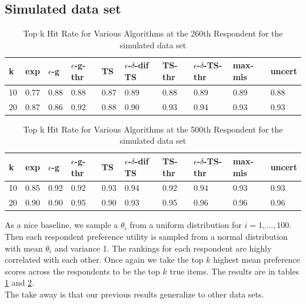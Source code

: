 \documentclass[nonblindrev]{informs3}
\newcommand{\fixedexpressS}{\textbf{exp}}
\newcommand{\egreedyS}{$\epsilon$-\textbf{g}}
\newcommand{\egreedythresS}{$\epsilon$-\textbf{g-thr}}
\newcommand{\misminS}{\textbf{max-mis}}
\newcommand{\tsS}{\textbf{TS} }
\newcommand{\edtsS}{$\epsilon$-$\delta$-\textbf{dif TS} }
\newcommand{\tsthresS}{\textbf{TS-thr} }
\newcommand{\edtsthresS}{$\epsilon$-$\delta$-\textbf{TS-thr} }
\newcommand{\uncertS}{\textbf{uncert} }
\begin{document}
\subsection{Simulated data set}
\begin{table}
\begin{center}
\begin{tabular}{llllllllll}
\hline   k &  \fixedexpressS & \egreedyS&\egreedythresS&\tsS&\edtsS&\tsthresS&\edtsthresS& \misminS& \uncertS \\\hline  10 & 0.77 &   0.88 & 0.88  & 0.87&0.89 & 	0.88&0.89 & 0.89 &  0.88 \\  20 &  0.87 &  0.86 &   0.92  & 0.88&0.90 &  	0.93&0.94&  0.93 &  0.93 \end{tabular}
\end{center}
\caption{Top k Hit Rate for Various Algorithms at the 260th Respondent for the simulated data set}
\label{table:nice260}
\end{table}
\begin{table}
\begin{center}
\begin{tabular}{llllllllll}
\hline   k &  \fixedexpressS & \egreedyS&\egreedythresS&\tsS&\edtsS&\tsthresS&\edtsthresS& \misminS& \uncertS  \\\hline    10 & 0.85&0.92&0.92 & 0.93&0.94 & 0.92&0.94&0.93 &   0.93 \\  20 & 0.90&0.90&0.95& 0.90 &0.93 & 0.95&0.96 &0.96& 0.96 
\end{tabular}
\end{center}
\caption{Top k Hit Rate for Various Algorithms at the 500th Respondent for the simulated data set}
\label{table:nice500}
\end{table}

As a nice baseline, we sample a $\theta_i$ from a uniform distribution for $i=1,\ldots,100$. Then each respondent preference utility is sampled from a normal distribution with mean $\theta_i$ and variance 1. The rankings for each respondent are highly correlated with each other. Once again we take the top $k$ highest mean preference scores across the respondents to be the top $k$ true items. The results are in tables \ref{table:nice260} and \ref{table:nice500}.\\ The take away is that our previous results generalize to other data sets.
\end{document}
